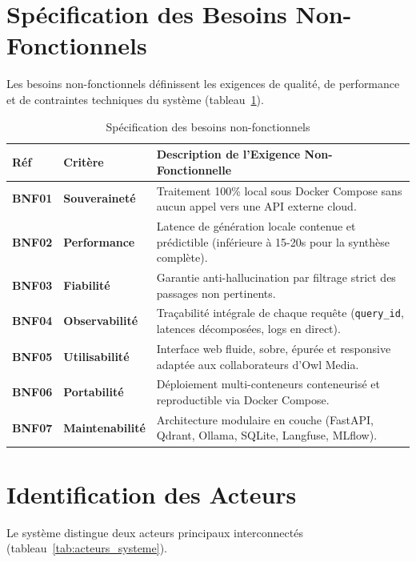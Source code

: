 \section{Spécification des Besoins Non-Fonctionnels}
Les besoins non-fonctionnels définissent les exigences de qualité, de performance et de contraintes techniques du système (tableau~\ref{tab:besoins_non_fonctionnels}).

\begin{table}[htbp]
\centering
\caption{Spécification des besoins non-fonctionnels}
\label{tab:besoins_non_fonctionnels}
\small
\begin{tabular}{|p{1.5cm}|p{2.5cm}|p{9.5cm}|}
\hline
\textbf{Réf} & \textbf{Critère} & \textbf{Description de l'Exigence Non-Fonctionnelle} \\ \hline
\textbf{BNF01} & \textbf{Souveraineté} & Traitement 100\% local sous Docker Compose sans aucun appel vers une API externe cloud. \\ \hline
\textbf{BNF02} & \textbf{Performance} & Latence de génération locale contenue et prédictible (inférieure à 15-20s pour la synthèse complète). \\ \hline
\textbf{BNF03} & \textbf{Fiabilité} & Garantie anti-hallucination par filtrage strict des passages non pertinents. \\ \hline
\textbf{BNF04} & \textbf{Observabilité} & Traçabilité intégrale de chaque requête (\texttt{query\_id}, latences décomposées, logs en direct). \\ \hline
\textbf{BNF05} & \textbf{Utilisabilité} & Interface web fluide, sobre, épurée et responsive adaptée aux collaborateurs d'Owl Media. \\ \hline
\textbf{BNF06} & \textbf{Portabilité} & Déploiement multi-conteneurs conteneurisé et reproductible via Docker Compose. \\ \hline
\textbf{BNF07} & \textbf{Maintenabilité} & Architecture modulaire en couche (FastAPI, Qdrant, Ollama, SQLite, Langfuse, MLflow). \\ \hline
\end{tabular}
\end{table}

\section{Identification des Acteurs}
Le système distingue deux acteurs principaux interconnectés (tableau~\ref{tab:acteurs_systeme}).

